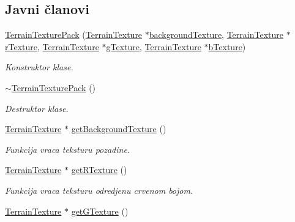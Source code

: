 \subsection*{Javni članovi}
\begin{DoxyCompactItemize}
\item 
\hyperlink{classtexture_1_1TerrainTexturePack_ac10238049352008175e477d2735a0fd6}{Terrain\+Texture\+Pack} (\hyperlink{classtexture_1_1TerrainTexture}{Terrain\+Texture} $\ast$\hyperlink{classtexture_1_1TerrainTexturePack_a5fcc575543662461b66195cfa21875b1}{background\+Texture}, \hyperlink{classtexture_1_1TerrainTexture}{Terrain\+Texture} $\ast$\hyperlink{classtexture_1_1TerrainTexturePack_a08b5f1b7665151358b6b162627fc37d4}{r\+Texture}, \hyperlink{classtexture_1_1TerrainTexture}{Terrain\+Texture} $\ast$\hyperlink{classtexture_1_1TerrainTexturePack_aee84140926644080ce963c6ffe5288da}{g\+Texture}, \hyperlink{classtexture_1_1TerrainTexture}{Terrain\+Texture} $\ast$\hyperlink{classtexture_1_1TerrainTexturePack_a004a654fdda8c9f552f40986e2dd072f}{b\+Texture})
\begin{DoxyCompactList}\small\item\em Konstruktor klase. \end{DoxyCompactList}\item 
\hyperlink{classtexture_1_1TerrainTexturePack_a763a7fb6c053d0998fc17b12adb28c3a}{$\sim$\+Terrain\+Texture\+Pack} ()
\begin{DoxyCompactList}\small\item\em Destruktor klase. \end{DoxyCompactList}\item 
\hyperlink{classtexture_1_1TerrainTexture}{Terrain\+Texture} $\ast$ \hyperlink{classtexture_1_1TerrainTexturePack_afcc4cf5d8e58eb3668cb0bb0e92ac6d9}{get\+Background\+Texture} ()
\begin{DoxyCompactList}\small\item\em Funkcija vraca teksturu pozadine. \end{DoxyCompactList}\item 
\hyperlink{classtexture_1_1TerrainTexture}{Terrain\+Texture} $\ast$ \hyperlink{classtexture_1_1TerrainTexturePack_a2e90d77d35768ae2c2c4a640b354fd2e}{get\+R\+Texture} ()
\begin{DoxyCompactList}\small\item\em Funkcija vraca teksturu odredjenu crvenom bojom. \end{DoxyCompactList}\item 
\hyperlink{classtexture_1_1TerrainTexture}{Terrain\+Texture} $\ast$ \hyperlink{classtexture_1_1TerrainTexturePack_aeaf5b66e3cb399312e265eab07bcdf3f}{get\+G\+Texture} ()

\end{DoxyCompactItemize}
